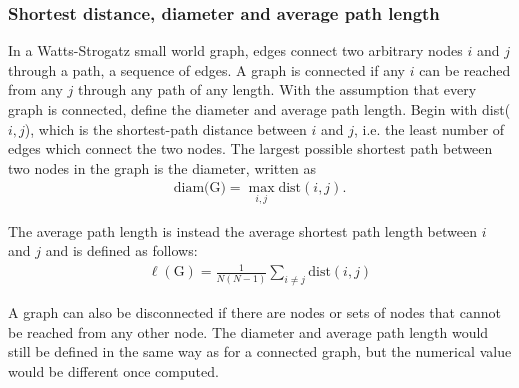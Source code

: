 \subsubsection{Shortest distance, diameter and average path length}

In a Watts-Strogatz small world graph, edges connect two arbitrary nodes $i$ and $j$ through a path, a sequence of edges. A graph is connected if any $i$ can be reached from any $j$ through any path of any length. With the assumption that every graph is connected, define the diameter and average path length. Begin with dist($i, j$), which is the shortest-path distance between $i$ and $j$, i.e. the least number of edges which connect the two nodes. The largest possible shortest path between two nodes in the graph is the diameter, written as 
\begin{align}
    \text{diam(G)} = \max_{i,j} \text{dist}(i,j).
    \label{eq:WSdiameter}
\end{align}

The average path length is instead the average shortest path length between $i$ and $j$ and is defined as follows:
\begin{align}
    \ell(\text{G}) = \frac{1}{N(N-1)}\sum_{i\neq j}\text{dist}(i,j)
    \label{eq:WSavgshortestpath}
\end{align}

A graph can also be disconnected if there are nodes or sets of nodes that cannot be reached from any other node. The diameter and average path length would still be defined in the same way as for a connected graph, but the numerical value would be different once computed.
